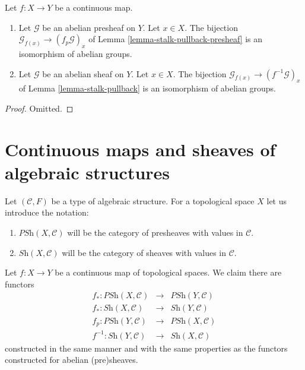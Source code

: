 \begin{lemma}
\label{lemma-pullback-abelian-stalk}
Let $f : X \to Y$ be a continuous map.
\begin{enumerate}
\item Let $\mathcal{G}$ be an abelian presheaf on $Y$.
Let $x \in X$. The bijection
$\mathcal{G}_{f(x)} \to (f_p\mathcal{G})_x$ of
Lemma \ref{lemma-stalk-pullback-presheaf} is an isomorphism of abelian groups.
\item Let $\mathcal{G}$ be an abelian sheaf on $Y$.
Let $x \in X$. The bijection
$\mathcal{G}_{f(x)} \to (f^{-1}\mathcal{G})_x$ of
Lemma \ref{lemma-stalk-pullback} is an isomorphism of abelian groups.
\end{enumerate}
\end{lemma}

\begin{proof}
Omitted.
\end{proof}



\section{Continuous maps and sheaves of algebraic structures}
\label{section-presheaves-structures-functorial}

\noindent
Let $(\mathcal{C}, F)$ be a type of algebraic structure.
For a topological space $X$ let us introduce the notation:
\begin{enumerate}
\item $\textit{PSh}(X, \mathcal{C})$ will be the category
of presheaves with values in $\mathcal{C}$.
\item $\textit{Sh}(X, \mathcal{C})$ will be the category
of sheaves with values in $\mathcal{C}$.
\end{enumerate}
Let $f : X \to Y$ be a continuous map of topological spaces.
We claim there are functors
\begin{eqnarray*}
f_* : \textit{PSh}(X, \mathcal{C}) &
\longrightarrow &
\textit{PSh}(Y, \mathcal{C}) \\
f_* : \textit{Sh}(X, \mathcal{C}) &
\longrightarrow &
\textit{Sh}(Y, \mathcal{C}) \\
f_p : \textit{PSh}(Y, \mathcal{C}) &
\longrightarrow &
\textit{PSh}(X, \mathcal{C}) \\
f^{-1} : \textit{Sh}(Y, \mathcal{C}) &
\longrightarrow &
\textit{Sh}(X, \mathcal{C})
\end{eqnarray*}
constructed in the same manner and with the same
properties as the functors constructed for abelian
(pre)sheaves. 

